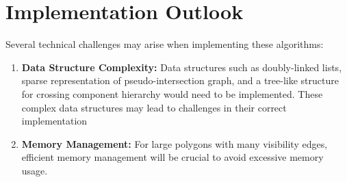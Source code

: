 \documentclass[10pt,letterpaper]{article}
\begin{document}
\section{Implementation Outlook}

Several technical challenges may arise when implementing these algorithms:

\begin{enumerate}
    \item \textbf{Data Structure Complexity:} Data structures such as doubly-linked lists, sparse representation of pseudo-intersection graph, and a tree-like structure for crossing component hierarchy would need to be implemented. These complex data structures may lead to challenges in their correct implementation
    
    \item \textbf{Memory Management:} For large polygons with many visibility edges, efficient memory management will be crucial to avoid excessive memory usage.
\end{enumerate}
\end{document}
